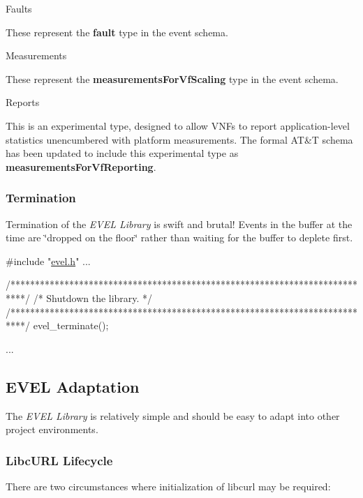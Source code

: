 \begin{DoxyEnumerate}
\item Faults

These represent the {\bfseries fault} type in the event schema.
\item Measurements

These represent the {\bfseries measurements\+For\+Vf\+Scaling} type in the event schema.
\item Reports

This is an experimental type, designed to allow V\+N\+Fs to report application-\/level statistics unencumbered with platform measurements. The formal A\+T\&T schema has been updated to include this experimental type as {\bfseries measurements\+For\+Vf\+Reporting}.
\end{DoxyEnumerate}\hypertarget{quickstart_qs_termination}{}\subsubsection{Termination}\label{quickstart_qs_termination}
Termination of the {\itshape E\+V\+E\+L Library} is swift and brutal! Events in the buffer at the time are \char`\"{}dropped on the floor\char`\"{} rather than waiting for the buffer to deplete first.


\begin{DoxyCode}
\textcolor{preprocessor}{#include "\hyperlink{evel_8h}{evel.h}"}
...

\textcolor{comment}{/***************************************************************************/}
\textcolor{comment}{/* Shutdown the library.                                                   */}
\textcolor{comment}{/***************************************************************************/}
evel\_terminate();

...
\end{DoxyCode}
\hypertarget{quickstart_qs_adaptation}{}\subsection{E\+V\+E\+L Adaptation}\label{quickstart_qs_adaptation}
The {\itshape E\+V\+E\+L Library} is relatively simple and should be easy to adapt into other project environments.

\subsubsection*{Libc\+U\+R\+L Lifecycle}

There are two circumstances where initialization of libcurl may be required\+:


